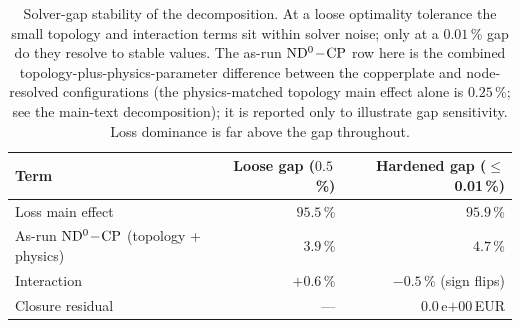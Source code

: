 \begin{table}[t]
\centering
\caption{Solver-gap stability of the decomposition. At a loose optimality tolerance the
small topology and interaction terms sit within solver noise; only at a
$0.01$\,\% gap do they resolve to stable values. The as-run $\mathrm{ND^{0}}\!-\!\mathrm{CP}$ row here is the
combined topology-plus-physics-parameter difference between the copperplate and node-resolved
configurations (the physics-matched topology main effect alone is $0.25$\,\%; see the main-text
decomposition); it is reported only to illustrate gap sensitivity. Loss dominance is far above the
gap throughout.}
\label{tab:gapstability}
\begin{tabular}{lrr}
\hline
Term & Loose gap ($0.5$\,\%) & Hardened gap ($\le$0.01\,\%) \\
\hline
Loss main effect & $95.5$\,\% & $95.9$\,\% \\
As-run $\mathrm{ND^{0}}\!-\!\mathrm{CP}$ (topology + physics) & $3.9$\,\% & $4.7$\,\% \\
Interaction & $+0.6$\,\% & $-0.5$\,\% (sign flips) \\
Closure residual & --- & $0.0$\,e${+}00$\,EUR \\
\hline
\end{tabular}
\end{table}
